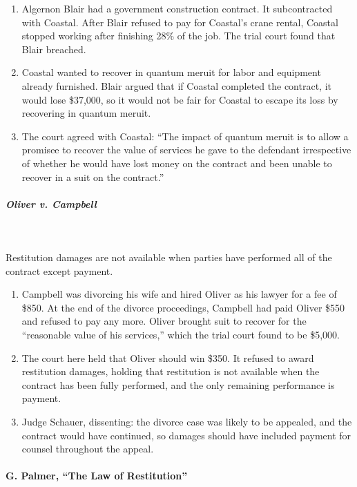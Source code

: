 \begin{enumerate}
    \item Algernon Blair had a government construction contract. It subcontracted 
    with Coastal. After Blair refused to pay for Coastal's crane rental, 
    Coastal stopped working after finishing 28\% of the job. The trial court 
    found that Blair breached.
    \item Coastal wanted to recover in quantum meruit for labor and equipment 
    already furnished. Blair argued that if Coastal completed the contract, it 
    would lose \$37,000, so it would not be fair for Coastal to escape its 
    loss by recovering in quantum meruit.
    \item The court agreed with Coastal: ``The impact of quantum meruit is to 
    allow a promisee to recover the value of services he gave to the defendant 
    irrespective of whether he would have lost money on the contract and been 
    unable to recover in a suit on the contract.''
\end{enumerate}

\paragraph{\emph{Oliver v. Campbell}}
~\\\\
Restitution damages are not available when parties have performed all of the 
contract except payment.

\begin{enumerate}
    \item Campbell was divorcing his wife and hired Oliver as his lawyer for a 
    fee of \$850. At the end of the divorce proceedings, Campbell had paid 
    Oliver \$550 and refused to pay any more. Oliver brought suit to recover 
    for the ``reasonable value of his services,'' which the trial court found 
    to be \$5,000. 
    \item The court here held that Oliver should win \$350. It refused to 
    award restitution damages, holding that restitution is not available when 
    the contract has been fully performed, and the only remaining performance 
    is payment.
    \item Judge Schauer, dissenting: the divorce case was likely to be 
    appealed, and the contract would have continued, so damages should have 
    included payment for counsel throughout the appeal.
\end{enumerate}

\paragraph{G. Palmer, ``The Law of Restitution''}


